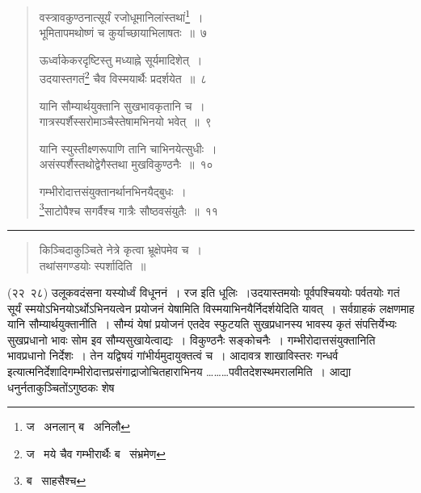 \documentclass[11pt, openany]{book}
\begin{document}

\newpage
\lfoot{}

\begin{quote}
{\na वस्त्रावकुण्ठनात्सूर्यं रजोधूमानिलांस्तथां\renewcommand{\thefootnote}{1}\footnote{ज \textendash\  अनलान् ब \textendash\  अनिलौ}~।\\
भूमितापमथोष्णं च कुर्याच्छायाभिलाषतः~॥~७

ऊर्ध्वाकेकरदृष्टिस्तु मध्याह्ने सूर्यमादिशेत्~।\\
उदयास्तगतं\renewcommand{\thefootnote}{2}\footnote{ज \textendash\  मये चैव गम्भीरार्थैः ब \textendash\  संभ्रमेण} चैव विस्मयार्थैः प्रदर्शयेत~॥~८

यानि सौम्यार्थयुक्तानि सुखभावकृतानि च~।\\
गात्रस्पर्शैस्सरोमाञ्चैस्तेषामभिनयो भवेत्~॥~९

यानि स्युस्तीक्ष्णरूपाणि तानि चाभिनयेत्सुधीः~।\\
असंस्पर्शैस्तथोद्वेगैस्तथा मुखविकुण्ठनैः~॥~१०

गम्भीरोदात्तसंयुक्तानर्थानभिनयैद्बुधः~।\\
\renewcommand{\thefootnote}{3}\footnote{ब \textendash\  साहसैश्च}साटोपैश्च सगर्वैश्च गात्रैः सौष्ठवसंयुतैः~॥~११}
\end{quote}

\hrule

\begin{quote}
{\qt किञ्चिदाकुञ्चिते नेत्रे कृत्वा भ्रूक्षेपमेव च~।\\
तथांसगण्डयोः स्पर्शादिति~॥}
\end{quote}

(२२\textendash\ २८) उलूकवदंसना यस्योर्ध्वं विधूननं~। रज इति धूलिः~।उदयास्तमयोः पूर्वपश्चिययोः पर्वतयोः गतं सूर्यं स्मयोऽभिनयोऽर्थोऽभिनयत्वेन प्रयोजनं येषामिति विस्मयाभिनयैर्निदर्शयेदिति यावत्~। सर्वग्राहकं लक्षणमाह यानि सौम्यार्थयुक्तानीति~। सौम्यं येषां प्रयोजनं एतदेव स्फुटयति सुखप्रधानस्य भावस्य कृतं संपत्तिर्येभ्यः सुखप्रधानो भावः सोम इव सौम्यसुखायेत्वाद्यः~। विकुण्ठनैः सङ्कोचनैः~। गम्भीरोदात्तसंयुक्तानिति भावप्रधानो निर्देशः~। तेन यद्विषयं गांभीर्यमुदायुक्तत्वं च~। आदावत्र शाखाविस्तरः गन्धर्व इत्यात्मनिर्देशादिगम्भीरोदात्तप्रसंगाद्राजोचितहाराभिनय \ldots \ldots \ldots पवीतदेशस्थमरालमिति~। आद्या धनुर्नताकुञ्चितोंऽगुष्ठकः शेष\textendash

\newpage
\end{document}
